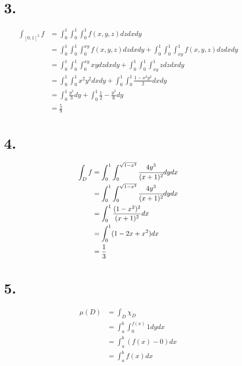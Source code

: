 \documentclass[11pt]{article}
\begin{document}
\section*{3.}
\begin{equation*}
    \begin{align}
        \int_{[0,1]^3} f &= \int_0^1 \int_0^1 \int_0^1 f(x,y,z) dz dx dy \\
        &= \int_0^1 \int_0^1 \int_0^{xy} f(x,y,z) dz dx dy + \int_0^1 \int_0^1 \int_{xy}^1 f(x,y,z) dz dx dy \\
        &= \int_0^1 \int_0^1 \int_0^{xy} xy dz dx dy + \int_0^1 \int_0^1 \int_{xy}^1 z dz dx dy \\
        &= \int_0^1 \int_0^1 x^2y^2 dx dy + \int_0^1 \int_0^1 \frac{1-x^2y^2}{2}  dx dy \\
        &= \int_0^1 \frac{y^2}{3} dy + \int_0^1 \frac{1}{2}- \frac{y^2}{6} dy \\
        &= \frac{5}{9}
    \end{align}
\end{equation*}
\pagebreak
\section*{4.}
\begin{equation*}
    \begin{align}
        \int_D f &= \int_0^1 \int_0^{\sqrt{1-x^2}} \cfrac{4y^3}{(x+1)^2} dy dx \\
        &= \int_0^1 \int_0^{\sqrt{1-x^2}} \cfrac{4y^3}{(x+1)^2} dy dx \\
        &= \int_0^1 \frac{(1-x^2)^2}{(x+1)^2} dx \\
        &= \int_0^1 (1-2x+x^2) dx \\
        &= \frac{1}{3}
    \end{align}    
\end{equation*}

\pagebreak
\section*{5.}
\begin{equation*}
    \begin{align}
        \mu(D) &= \int_D \chi_D \\
        &= \int_a^b \int_0^{f(x)} 1 dydx \\
        &= \int_a^b (f(x)-0)dx \\
        &= \int_a^b f(x)dx
    \end{align}
\end{equation*}
\pagebreak
\end{document}
